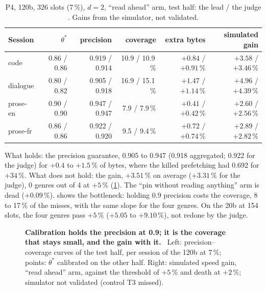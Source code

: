 \begin{table}[tbp]
\centering\small
\caption[P4: the lead and its judge]{P4, 120b, 326 slots (7\,\%), $d = 2$, ``read ahead'' arm, test half: the lead / the judge \mes. Gains from the simulator, not validated.}
\label{t3mim:tab:p4}
\setlength{\tabcolsep}{4pt}
\begin{tabular}{@{}lrrrrr@{}}
\toprule
Session & $\theta^\ast$ & precision & coverage & extra bytes & simulated gain \\
\midrule
code & 0.86 / 0.86 & 0.919 / 0.914 & 10.9 / 10.9\,\% & $+0.84$ / $+0.91\,\%$ & $+3.58$ / $+3.46\,\%$ \\
dialogue & 0.80 / 0.82 & 0.905 / 0.918 & 16.9 / 15.1\,\% & $+1.47$ / $+1.14\,\%$ & $+4.96$ / $+4.39\,\%$ \\
prose-en & 0.90 / 0.90 & 0.947 / 0.947 & 7.9 / 7.9\,\% & $+0.41$ / $+0.42\,\%$ & $+2.60$ / $+2.56\,\%$ \\
prose-fr & 0.86 / 0.86 & 0.922 / 0.920 & 9.5 / 9.4\,\% & $+0.72$ / $+0.74\,\%$ & $+2.89$ / $+2.82\,\%$ \\
\bottomrule
\end{tabular}
\end{table}

What holds: the precision guarantee, 0.905 to 0.947 (0.918 aggregated; 0.922 for the judge) for $+0.4$ to $+1.5\,\%$ of bytes, where the killed prefetching had 0.692 for $+34\,\%$. What does not hold: the gain, $+3.51\,\%$ on average ($+3.31\,\%$ for the judge), 0 genres out of 4 at $+5\,\%$ (\cref{t3mim:tab:p4}). The ``pin without reading anything'' arm is dead ($+0.09\,\%$).  shows the bottleneck: holding 0.9 precision costs the coverage, 8 to 17\,\% of the misses, with the same slope for the four genres. On the 20b at 154 slots, the four genres pass $+5\,\%$ ($+5.05$ to $+9.10\,\%$), not redone by the judge.

\begin{figure}[tbp]
\centering
{}
\caption[P4: precision, coverage and simulated gain]{\textbf{Calibration holds the precision at 0.9; it is the coverage that stays small, and the gain with it.} \mes~Left: precision--coverage curves of the test half, per session of the 120b at 7\,\%; points: $\theta^\ast$ calibrated on the other half. Right: simulated speed gain, ``read ahead'' arm, against the threshold of $+5\,\%$ and death at $+2\,\%$; simulator not validated (control T3 missed). \HorsStyle{}}
\label{fig:t3-mim-p4}
\end{figure}

